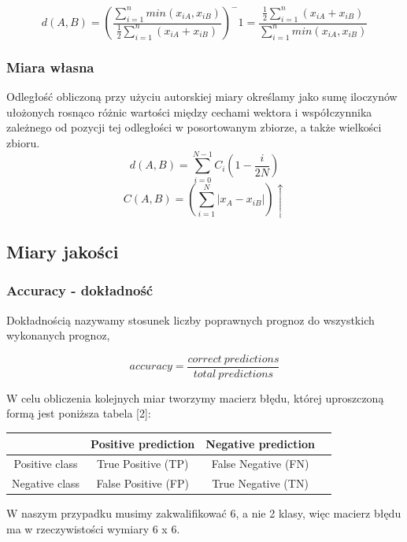 \documentclass{classrep}
\begin{document}
\begin{equation}
d(A, B) =  (\frac{\sum_{i=1}^n{min(x_{iA}, x_{iB})}}{\frac{1}{2}\sum_{i=1}^n({x_{iA} + x_{iB}})})^-1 = \frac{\frac{1}{2}\sum_{i=1}^n({x_{iA} + x_{iB}})}{\sum_{i=1}^n{min(x_{iA}, x_{iB})}}
\end{equation}
\subsubsection{Miara własna}
Odległość obliczoną przy użyciu autorskiej miary określamy jako sumę iloczynów ułożonych rosnąco różnic wartości między cechami wektora i współczynnika zależnego od pozycji tej odległości w posortowanym zbiorze, a także wielkości zbioru.
\begin{equation}
d(A, B) =  \sum_{i=0}^{N-1}C_i(1 - \frac{i}{2N})
\end{equation}
\begin{equation}
C(A,B) =  (\sum_{i=1}^N|x_{A} - x_{iB}|)\uparrow
\end{equation}

\subsection{Miary jakości}
\subsubsection{Accuracy - dokładność}
Dokładnością nazywamy stosunek liczby poprawnych prognoz do wszystkich wykonanych prognoz,

\begin{equation}
accuracy = \frac{correct\ predictions}{total\ predictions}
\end{equation}

W celu obliczenia kolejnych miar tworzymy macierz błędu, której uproszczoną formą jest poniższa tabela [2]:

\begin{center}
	\begin{tabular}{ |c|c|c|c| } 
	\hline
	 & Positive prediction & Negative prediction \\
	\hline
	Positive class & True Positive (TP) & False Negative (FN) \\ 
	\hline
	Negative class & False Positive (FP) & True Negative (TN) \\ 
	\hline
	\end{tabular}
\end{center}

W naszym przypadku musimy zakwalifikować 6, a nie 2 klasy, więc macierz błędu ma w rzeczywistości wymiary 6 x 6.
\end{document}
